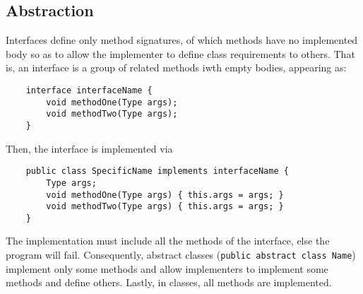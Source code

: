 \documentclass[letterpaper, openany, justified]{tufte-book}
\newcommand{\cd}[1]{\lstinline{#1}}
\begin{document}
\begin{fullwidth}
\section{Abstraction}
Interfaces define only method signatures, of which methods have no implemented body so as to allow the implementer to define class requirements to others. That is, an interface is a group of related methods iwth empty bodies, appearing as:
\begin{lstlisting}
    interface interfaceName {
        void methodOne(Type args);
        void methodTwo(Type args);
    }
\end{lstlisting}
Then, the interface is implemented via
\begin{lstlisting}
    public class SpecificName implements interfaceName {
        Type args;
        void methodOne(Type args) { this.args = args; }
        void methodTwo(Type args) { this.args = args; }
    }
\end{lstlisting}
The implementation must include all the methods of the interface, else the program will fail. Consequently, abstract classes (\cd{public abstract class Name}) implement only some methods and allow implementers to implement some methods and define others. Lastly, in classes, all methods are implemented.


\end{fullwidth}
\end{document}
